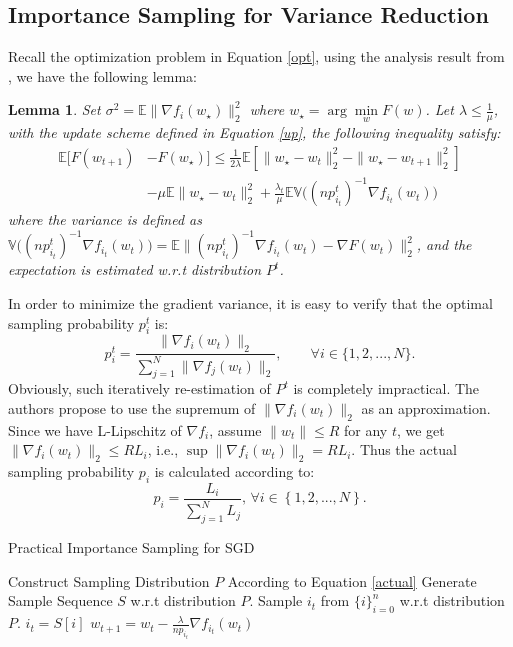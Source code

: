 \documentclass[twoside,leqno,twocolumn]{article}
\newtheorem{lemma}[theorem]{Lemma}
\begin{document}
\subsection{Importance Sampling for Variance Reduction} Recall the optimization problem in Equation \ref{opt}, using the analysis result from \cite{p_zhao}, we have the following lemma:
\begin{lemma}
	Set $\sigma^2=\mathbb{E}\|\nabla f_i(w_{\star})\|_2^2$ where $w_{\star}=\arg\underset{w}{\min}F(w)$. Let $\lambda \le \frac{1}{\mu}$, with the update scheme defined in Equation \ref{up}, the following inequality satisfy:
	\begin{equation}
	\begin{aligned}
	\mathbb{E}[F(w_{t+1})&-F(w_{\star})]\le \frac{1}{2\lambda}\mathbb{E}[\|w_{\star}-w_t\|_2^2-\|w_{\star}-w_{t+1}\|_2^2]\\ 
	&-\mu\mathbb{E}\|w_{\star}-w_t\|_2^2+\frac{\lambda_t}{\mu}\mathbb{E}\mathbb{V}\Big((np_{i_t}^t)^{-1}\nabla f_{i_t}(w_t)\Big)
	\end{aligned}
	\end{equation}
	where the variance is defined as $\mathbb{V}\big((np^t_{i_t})^{-1}\nabla f_{i_t}(w_t)\big)=\mathbb{E}\|(np^t_{i_t})^{-1}\nabla f_{i_t}(w_t)-\nabla F(w_t)\|_2^2$, and the expectation is estimated w.r.t distribution $P^t$.
\end{lemma}
In order to minimize the gradient variance, it is easy to verify that the optimal sampling probability $p_i^t$ is:
\begin{equation}
\label{precise}
p_i^t=\frac{\|\nabla f_{i}(w_t)\|_2}{\sum_{j=1}^N\|\nabla f_{j}(w_t)\|_2}, \qquad \forall i \in \{1,2,...,N\}.
\end{equation}
Obviously, such iteratively re-estimation of $P^t$ is completely impractical. The authors propose to use the supremum of $\|\nabla f_{i}(w_t)\|_2$ as an approximation. Since we have L-Lipschitz of $\nabla f_i$, assume $\|w_t\| \le R$ for any $t$, we get $\|\nabla f_{i}(w_t)\|_2 \le RL_i$, i.e., $\sup\|\nabla f_{i}(w_t)\|_2=RL_i$. Thus the actual sampling probability $p_i$ is calculated according to:
\begin{equation}
\label{actual}
p_i=\frac{L_i}{\sum_{j=1}^{N}L_j}, \, \forall i \in\left\{1,2,...,N\right\}.
\end{equation} 
\begin{algorithm}[t]
	\caption{Practical Importance Sampling for SGD}
	\begin{algorithmic}[1]
		\State Construct Sampling Distribution $P$ According to Equation \ref{actual}
		\State Generate Sample Sequence $S$ w.r.t distribution $P$.
		\State Sample $i_t$ from $\{i\}_{i=0}^n$ w.r.t distribution $P$.
		\State $i_t=S[i]$
		\State $w_{t+1} = w_t-\frac{\lambda}{np_{i_t}}\nabla f_{i_t}(w_t)$
		\EndFor\label{IS-practical}
		\EndProcedure
	\end{algorithmic}
\end{algorithm}
\end{document}
